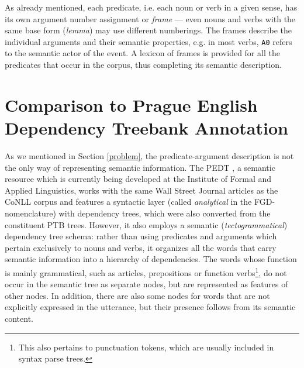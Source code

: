 \documentclass[12pt,notitlepage]{report}
\begin{document}
As already mentioned, each predicate, i.e. each noun or verb in a given sense, has its own argument number assignment or \emph{frame} --- even nouns and verbs with the same base form (\emph{lemma}) may use different numberings. The frames describe the individual arguments and their semantic properties, e.g. in most verbs, \texttt{A0} refers to the semantic actor of the event. A lexicon of frames is provided for all the predicates that occur in the corpus, thus completing its semantic description.

\section{Comparison to Prague English Dependency Treebank Annotation}\label{pedt}

As we mentioned in Section \ref{problem}, the predicate-argument description is not the only way of representing semantic information. The PEDT \citep{cinkova09}, a semantic resource which is currently being developed at the Institute of Formal and Applied Linguistics, works with the same Wall Street Journal articles as the CoNLL corpus and features a syntactic layer (called \emph{analytical} in the FGD-nomenclature) with dependency trees, which were also converted from the constituent PTB trees. However, it also employs a semantic (\emph{tectogrammatical}) dependency tree schema: rather than using predicates and arguments which pertain exclusively to nouns and verbs, it organizes all the words that carry semantic information into a hierarchy of dependencies. The words whose function is mainly grammatical, such as articles, prepositions or function verbs\footnote{This also pertains to punctuation tokens, which are usually included in syntax parse trees.}, do not occur in the semantic tree as separate nodes, but are represented as features of other nodes. In addition, there are also some nodes for words that are not explicitly expressed in the utterance, but their presence follows from its semantic content. 
\end{document}
